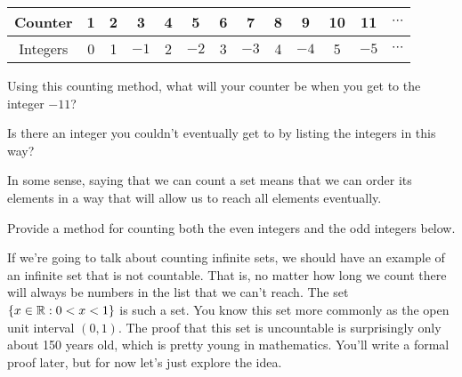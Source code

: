 \begin{center}
\begin{tabular}{c|cccccccccccc}
\hline
Counter & 1 & 2 & 3 & 4 & 5 & 6 & 7 & 8 & 9 & 10 &11 & $\cdots$\\
\hline
Integers & 0 &1 & $-1$ & 2 & $-2$ & 3 & $-3$ & 4 & $-4$ & 5 & $-5$ & $\cdots$\\
\hline
\end{tabular}
\label{tab:ints}
\end{center}
\begin{question}
\item Using this counting method, what will your counter be when you get to the integer $-11$?

\vspace{1in}
\item Is there an integer you couldn't eventually get to by listing the integers in this way?

\vspace{1in}
\end{question}

In some sense, saying that we can count a set means that we can order its elements in a way that will allow us to reach all elements eventually.

\begin{question}[resume]
\item Provide a method for counting both the even integers and the odd integers below.

\vspace{4in}
\end{question}

If we're going to talk about counting infinite sets, we should have an example of an infinite set that is not countable.  That is, no matter how long we count there will always be numbers in the list that we can't reach.  The set $\left\{x \in \mathbb{R}: 0 < x < 1\right\}$ is such a set.  You know this set more commonly as the open unit interval $(0,1)$.  The proof that this set is uncountable is surprisingly only about 150 years old, which is pretty young in mathematics.  You'll write a formal proof later, but for now let's just explore the idea.\\

